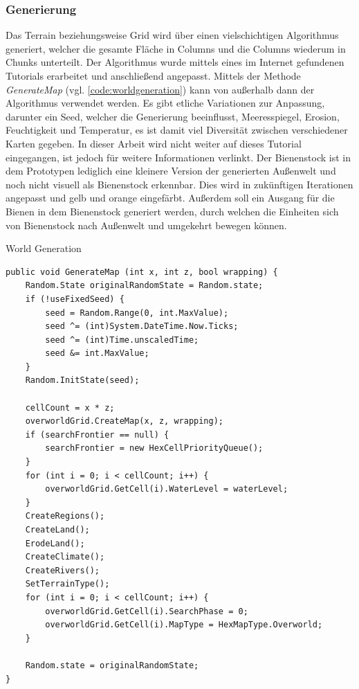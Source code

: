 \subsubsection{Generierung}
Das Terrain beziehungsweise Grid wird über einen vielschichtigen Algorithmus generiert, welcher die gesamte Fläche in Columns und die Columns wiederum in Chunks unterteilt. Der Algorithmus wurde mittels eines im Internet gefundenen Tutorials \cite*[]{world:tutorial} erarbeitet und anschließend angepasst. Mittels der Methode \textit{GenerateMap} (vgl. \autoref{code:worldgeneration}) kann von außerhalb dann der Algorithmus verwendet werden. Es gibt etliche Variationen zur Anpassung, darunter ein Seed, welcher die Generierung beeinflusst, Meeresspiegel, Erosion, Feuchtigkeit und Temperatur, es ist damit viel Diversität zwischen verschiedener Karten gegeben. In dieser Arbeit wird nicht weiter auf dieses Tutorial eingegangen, ist jedoch für weitere Informationen verlinkt. Der Bienenstock ist in dem Prototypen lediglich eine kleinere Version der generierten Außenwelt und noch nicht visuell als Bienenstock erkennbar. Dies wird in zukünftigen Iterationen angepasst und gelb und orange eingefärbt. Außerdem soll ein Ausgang für die Bienen in dem Bienenstock generiert werden, durch welchen die Einheiten sich von Bienenstock nach Außenwelt und umgekehrt bewegen können. 

\begin{listing}[H]
\caption{World Generation}
\label{code:worldgeneration}
\begin{verbatim}
public void GenerateMap (int x, int z, bool wrapping) {
    Random.State originalRandomState = Random.state;
    if (!useFixedSeed) {
        seed = Random.Range(0, int.MaxValue);
        seed ^= (int)System.DateTime.Now.Ticks;
        seed ^= (int)Time.unscaledTime;
        seed &= int.MaxValue;
    }
    Random.InitState(seed);

    cellCount = x * z;
    overworldGrid.CreateMap(x, z, wrapping);
    if (searchFrontier == null) {
        searchFrontier = new HexCellPriorityQueue();
    }
    for (int i = 0; i < cellCount; i++) {
        overworldGrid.GetCell(i).WaterLevel = waterLevel;
    }
    CreateRegions();
    CreateLand();
    ErodeLand();
    CreateClimate();
    CreateRivers();
    SetTerrainType();
    for (int i = 0; i < cellCount; i++) {
        overworldGrid.GetCell(i).SearchPhase = 0;
        overworldGrid.GetCell(i).MapType = HexMapType.Overworld;
    }

    Random.state = originalRandomState;
}
\end{verbatim}
\end{listing}